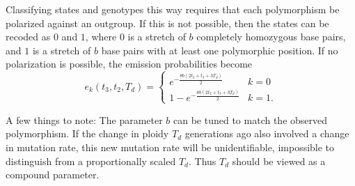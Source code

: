 \documentclass{article}
\begin{document}
Classifying states and genotypes this way requires that each polymorphism be
polarized against an outgroup. If this is not possible, then the states can be
recoded as $0$ and $1$, where $0$ is a stretch of $b$ completely homozygous
base pairs, and $1$ is a stretch of $b$ base pairs with at least one
polymorphic position. If no polarization is possible, the emission
probabilities become
\begin{equation}
    e_k(t_3,t_2, T_d) =
    \begin{cases}
        e^{-\frac{\theta b \left(2t_2+t_3+3T_d\right)}{2}}&k=0\\
        1-e^{-\frac{\theta b \left(2t_2+t_3+3T_d\right)}{2}}&k=1.
    \end{cases}
    \label{eq:emissionprobsnopolar}
\end{equation}

A few things to note: The parameter $b$ can be tuned to match the observed
polymorphism. If the change in ploidy $T_d$ generations ago also involved a
change in mutation rate, this new mutation rate will be unidentifiable,
impossible to distinguish from a proportionally scaled $T_d$. Thus $T_d$ should
be viewed as a compound parameter.
\end{document}
